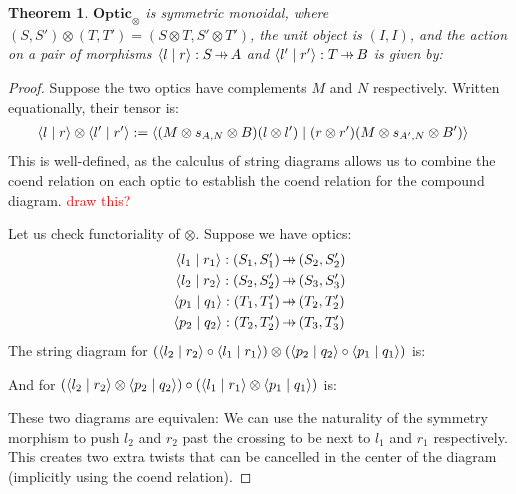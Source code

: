 \documentclass[11pt,a4paper]{article}
\theoremstyle{plain}
\newtheorem{theorem}{Theorem}[subsection]
\theoremstyle{definition}
\newcommand{\Optic}{\mathbf{Optic}}
\newcommand{\rep}[2]{{\ensuremath \left\langle #1 \mid #2 \right\rangle}}
\newcommand{\hto}{\ensuremath{\,\mathaccent\shortmid\rightarrow\,}}
\newcommand{\todo}[1]{\textcolor{red}{\small #1}}
\begin{document}
\begin{theorem}
  $\Optic_\otimes$ is symmetric monoidal, where $(S, S') \otimes (T, T') = (S \otimes T, S' \otimes T')$, the unit object is $(I, I)$, and the action on a pair of morphisms $\rep{l}{r} : S \hto A$ and $\rep{l'}{r'} : T \hto B$ is given by:
  \begin{center}
    
  \end{center}
\end{theorem}
\begin{proof}
  Suppose the two optics have complements $M$ and $N$ respectively. Written equationally, their tensor is:
  \begin{align*}
    \rep{l}{r} \otimes \rep{l'}{r'} &:= \rep{(M \otimes s_{A,N} \otimes B)(l \otimes l')}{(r \otimes r')(M \otimes s_{A',N} \otimes B')}
  \end{align*}
  This is well-defined, as the calculus of string diagrams allows us to combine the coend relation on each optic to establish the coend relation for the compound diagram. \todo{draw this?}

  Let us check functoriality of $\otimes$. Suppose we have optics:
  \begin{align*}
    \rep{l_1}{r_1} : (S_1, S_1') &\hto (S_2, S_2') \\
    \rep{l_2}{r_2} : (S_2, S_2') &\hto (S_3, S_3') \\
    \rep{p_1}{q_1} : (T_1, T_1') &\hto (T_2, T_2') \\
    \rep{p_2}{q_2} : (T_2, T_2') &\hto (T_3, T_3')
  \end{align*}
  The string diagram for $(\rep{l_2}{r_2} \circ \rep{l_1}{r_1}) \otimes (\rep{p_2}{q_2} \circ \rep{p_1}{q_1})$ is:
  \begin{center}
    
  \end{center}
  And for $(\rep{l_2}{r_2} \otimes \rep{p_2}{q_2}) \circ (\rep{l_1}{r_1} \otimes \rep{p_1}{q_1})$ is:
  \begin{center}
    
  \end{center}
  These two diagrams are equivalen: We can use the naturality of the symmetry morphism to push $l_2$ and $r_2$ past the crossing to be next to $l_1$ and $r_1$ respectively. This creates two extra twists that can be cancelled in the center of the diagram (implicitly using the coend relation).


\end{proof}
\end{document}
